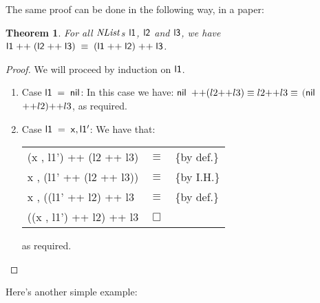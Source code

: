 \documentclass{book}
\newcommand{\D}[1]{\blue{\mathsf{#1}}}
\newcommand{\F}[1]{\green{\mathsf{#1}}}
\newcommand{\V}[1]{\purple{\mathit{#1}}}
\newtheorem{theorem}{Theorem}
\begin{document}
The same proof can be done in the following way, in a paper:

\begin{theorem}
For all \ensuremath{\V{NList}}s \ensuremath{\F{l1}}, \ensuremath{\F{l2}} and \ensuremath{\F{l3}}, we have \ensuremath{\F{l1}\;\F{++}\;(\F{l2}\;\F{++}\;\F{l3})\;\equiv \;(\F{l1}\;\F{++}\;\F{l2})\;\F{++}\;\F{l3}}.
\end{theorem}
\begin{proof}
We will proceed by induction on \ensuremath{\F{l1}}.
\begin{enumerate}
  \item Case \ensuremath{\F{l1}\;\mathrel{=}\;\D{nil}}: In this case we have: \ensuremath{\D{nil}} $\ensuremath{\F{++}} (l2 \ensuremath{\F{++}} l3) \equiv l2 \ensuremath{\F{++}} l3 \equiv$ $($\ensuremath{\D{nil}} $\ensuremath{\F{++}} l2) \ensuremath{\F{++}} l3$, as required.
  \item Case \ensuremath{\F{l1}\;\mathrel{=}\;\F{x},\F{l1'}}: We have that:
  \begin{center}
  \begin{tabular}{lcl}
    (x , l1') ++ (l2 ++ l3) & $\equiv$ & \{by def.\}\\
    x , (l1' ++ (l2 ++ l3)) & $\equiv$ & \{by I.H.\}\\
    x , ((l1' ++ l2) ++ l3  & $\equiv$ & \{by def.\}\\
    ((x , l1') ++ l2) ++ l3 & $\Box$  
  \end{tabular}
  \end{center}
  as required.
\end{enumerate}
\end{proof}

Here's another simple example:
\end{document}
